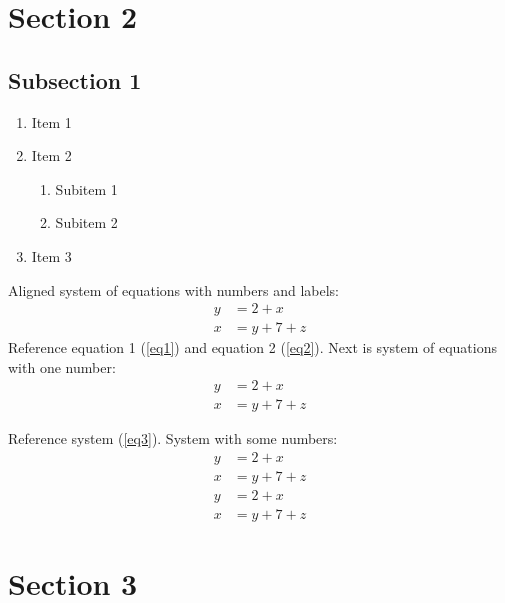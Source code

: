 \documentclass[a4paper,12pt]{article}
\begin{document}
    \section{Section 2}
    \subsection{Subsection 1}
    \blindtext
    \begin{enumerate}
    	\item Item 1
    	\item Item 2
    	\begin{enumerate}
    		\item Subitem 1
    		\item Subitem 2
    	\end{enumerate}
    	\item Item 3
    \end{enumerate}
    Aligned system of equations with numbers and labels:
	\begin{align}
		y &= 2 + x \label{eq1} \\
		x &= y + 7 + z \label{eq2}
	\end{align}
	Reference equation 1 (\ref{eq1}) and equation 2 (\ref{eq2}). Next is system of equations with one number:
	\begin{equation}
	\begin{aligned}
		y &= 2 + x  \\
		x &= y + 7 + z
	\end{aligned}
	\label{eq3}
	\end{equation}
	
	Reference system (\ref{eq3}). System with some numbers:
	\begin{align}
		y &= 2 + x  \nonumber \\
		x &= y + 7 + z \\
		y &= 2 + x  \nonumber \\
		x &= y + 7 + z 
	\end{align}
	\section{Section 3}
\end{document}
